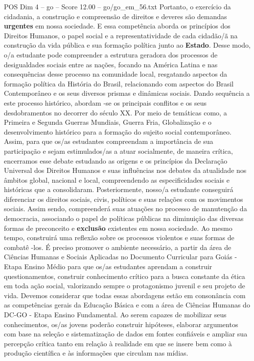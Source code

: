 \begin{textsample}{POS Dim 4 – go – Score 12.00 – go/go\_em\_56.txt}
Portanto, o exercício da cidadania, a construção e compreensão de direitos e deveres são demandas \textbf{urgentes} em nossa sociedade.
E essa competência aborda os princípios dos Direitos Humanos, o papel social e a representatividade de cada cidadão/ã na construção da vida pública e sua formação política junto ao \textbf{Estado}.
Desse modo, o/a estudante pode compreender a estrutura geradora dos processos de desigualdades sociais entre as nações, focando na América Latina e nas consequências desse processo na comunidade local, resgatando aspectos da formação política da História do Brasil, relacionando com aspectos do Brasil Contemporâneo e os seus diversos prismas e dinâmicas sociais.
Dando sequência a este processo histórico, abordam -se os principais conflitos e os seus desdobramentos no decorrer do século XX.
Por meio de temáticas como, a Primeira e Segunda Guerras Mundiais, Guerra Fria, Globalização e o desenvolvimento histórico para a formação do sujeito social contemporâneo.
Assim, para que os/as estudantes compreendam a importância de sua participação e sejam estimulados/as a atuar socialmente, de maneira crítica, encerramos esse debate estudando as origens e os princípios da Declaração Universal dos Direitos Humanos e suas influências nos debates da atualidade nos âmbitos global, nacional e local, compreendendo as especificidades sociais e históricas que a consolidaram.
Posteriormente, nosso/a estudante conseguirá diferenciar os direitos sociais, civis, políticos e suas relações com os movimentos sociais.
Assim sendo, compreenderá suas atuações no processo de manutenção da democracia, associando o papel de políticas públicas na diminuição das diversas formas de preconceito e \textbf{exclusão} existentes em nossa sociedade.
Ao mesmo tempo, construirá uma reflexão sobre os processos violentos e suas formas de combatê -los.
É preciso promover o ambiente necessário, a partir da área de Ciências Humanas e Sociais Aplicadas no Documento Curricular para Goiás - Etapa Ensino Médio para que os/as estudantes aprendam a construir questionamentos, construir conhecimento crítico para a busca constante da ética em toda ação social, valorizando sempre o protagonismo juvenil e seu projeto de vida.
Devemos considerar que todas essas abordagens estão em consonância com as competências gerais da Educação Básica e com a área de Ciências Humanas do DC-GO - Etapa Ensino Fundamental.
Ao serem capazes de mobilizar seus conhecimentos, os/as jovens poderão construir hipóteses, elaborar argumentos com base na seleção e sistematização de dados em fontes confiáveis e ampliar sua percepção crítica tanto em relação à realidade em que se insere bem como à produção científica e às informações que circulam nas mídias.

\end{textsample}

